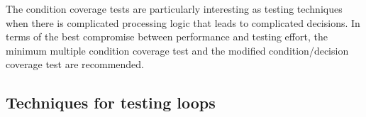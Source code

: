 \documentclass[master,english,smartquotes,apa]{hgbthesis}
\begin{document}




	The condition coverage tests are particularly interesting as testing techniques when there is complicated processing logic that leads to complicated decisions. In terms of the best compromise between performance and testing effort, the minimum multiple condition coverage test and the modified condition/decision coverage test are recommended.

	\subsection{Techniques for testing loops}
\end{document}
